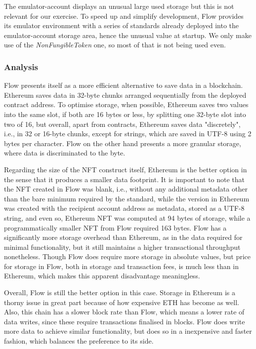 \documentclass[../NFTComp_IEEE.tex]{subfiles}
\begin{document}
The emulator-account displays an unusual large used storage but this is not relevant for our exercise. To speed up and simplify development, Flow provides its emulator environment with a series of standards already deployed into the emulator-account storage area, hence the unusual value at startup. We only make use of the \textit{NonFungibleToken} one, so most of that is not being used even.

\subsubsection{Analysis}
Flow presents itself as a more efficient alternative to save data in a blockchain. Ethereum saves data in 32-byte chunks arranged sequentially from the deployed contract address. To optimise storage, when possible, Ethereum saves two values into the same slot, if both are 16 bytes or less, by splitting one 32-byte slot into two of 16, but overall, apart from contracts, Ethereum saves data "discretely", i.e., in 32 or 16-byte chunks, except for strings, which are saved in UTF-8 using 2 bytes per character. Flow on the other hand presents a more granular storage, where data is discriminated to the byte.
\par
Regarding the size of the NFT construct itself, Ethereum is the better option in the sense that it produces a smaller data footprint. It is important to note that the NFT created in Flow was blank, i.e., without any additional metadata other than the bare minimum required by the standard, while the version in Ethereum was created with the recipient account address as metadata, stored as a UTF-8 string, and even so, Ethereum NFT was computed at 94 bytes of storage, while a programmatically smaller NFT from Flow required 163 bytes. Flow has a significantly more storage overhead than Ethereum, as in the data required for minimal functionality, but it still maintains a higher transactional throughput nonetheless. Though Flow does require more storage in absolute values, but price for storage in Flow, both in storage and transaction fees, is much less than in Ethereum, which makes this apparent disadvantage meaningless.
\par
Overall, Flow is still the better option in this case. Storage in Ethereum is a thorny issue in great part because of how expensive ETH has become as well. Also, this chain has a slower block rate than Flow, which means a lower rate of data writes, since these require transactions finalised in blocks. Flow does write more data to achieve similar functionality, but does so in a inexpensive and faster fashion, which balances the preference to its side.
\end{document}

